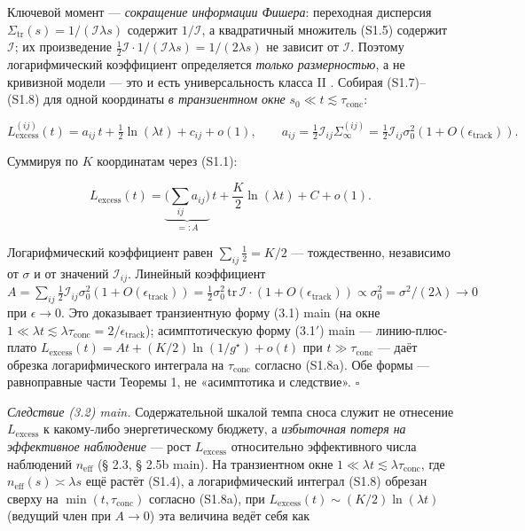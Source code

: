 \documentclass[12pt]{iopart}
\begin{document}
Ключевой момент --- \emph{сокращение информации Фишера}: переходная дисперсия \(\Sigma_{\text{tr}}(s) = 1/(\mathcal I\lambda s)\) содержит \(1/\mathcal I\), а квадратичный множитель (S1.5) содержит \(\mathcal I\); их произведение \(\tfrac12\mathcal I\cdot 1/(\mathcal I\lambda s) = 1/(2\lambda s)\) не зависит от \(\mathcal I\). Поэтому логарифмический коэффициент определяется \emph{только размерностью}, а не кривизной модели --- это и есть универсальность класса II \cite{BialekNemenmanTishby2001}. Собирая (S1.7)--(S1.8) для одной координаты \emph{в транзиентном окне} \(s_0 \ll t \lesssim \tau_{\text{conc}}\):



\begin{equation}L_{\text{excess}}^{(ij)}(t) = a_{ij}\,t + \tfrac12\ln(\lambda t) + c_{ij} + o(1), \qquad a_{ij} = \tfrac12\mathcal I_{ij}\Sigma_\infty^{(ij)} = \tfrac12\mathcal I_{ij}\sigma_0^2(1+O(\epsilon_{\text{track}})). \tag{S1.9}\end{equation}



Суммируя по \(K\) координатам через (S1.1):



\begin{equation}L_{\text{excess}}(t) = \underbrace{\Big(\sum_{ij}a_{ij}\Big)}_{=:A}\,t + \frac{K}{2}\ln(\lambda t) + C + o(1). \tag{S1.10}\end{equation}



Логарифмический коэффициент равен \(\sum_{ij}\tfrac12 = K/2\) --- тождественно, независимо от \(\sigma\) и от значений \(\mathcal I_{ij}\). Линейный коэффициент \(A = \sum_{ij}\tfrac12\mathcal I_{ij}\sigma_0^2(1+O(\epsilon_{\text{track}})) = \tfrac12\sigma_0^2\,\mathrm{tr}\,\mathcal I\cdot(1+O(\epsilon_{\text{track}})) \propto \sigma_0^2 = \sigma^2/(2\lambda) \to 0\) при \(\epsilon \to 0\). Это доказывает транзиентную форму (3.1) main (на окне \(1\ll\lambda t\lesssim\lambda\tau_{\text{conc}} = 2/\epsilon_{\text{track}}\)); асимптотическую форму (3.1\('\)) main --- линию-плюс-плато \(L_{\text{excess}}(t) = At + (K/2)\ln(1/g^\star) + o(t)\) при \(t\gg\tau_{\text{conc}}\) --- даёт обрезка логарифмического интеграла на \(\tau_{\text{conc}}\) согласно (S1.8a). Обе формы --- равноправные части Теоремы 1, не «асимптотика и следствие». \(\square\)



\emph{Следствие (3.2) main.} Содержательной шкалой темпа сноса служит не отнесение \(L_{\text{excess}}\) к какому-либо энергетическому бюджету, а \emph{избыточная потеря на эффективное наблюдение} --- рост \(L_{\text{excess}}\) относительно эффективного числа наблюдений \(n_{\text{eff}}\) (§ 2.3, § 2.5b main). На транзиентном окне \(1\ll\lambda t\lesssim\lambda\tau_{\text{conc}}\), где \(n_{\text{eff}}(s)\asymp\lambda s\) ещё растёт (S1.4), а логарифмический интеграл (S1.8) обрезан сверху на \(\min(t,\tau_{\text{conc}})\) согласно (S1.8a), при \(L_{\text{excess}}(t) \sim (K/2)\ln(\lambda t)\) (ведущий член при \(A \to 0\)) эта величина ведёт себя как
\end{document}

